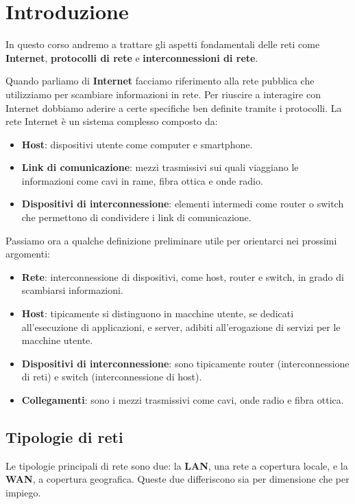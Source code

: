 \chapter{Introduzione}
In questo corso andremo a trattare gli aspetti fondamentali delle reti 
come \textbf{Internet}, \textbf{protocolli di rete} e
\textbf{interconnessioni di rete}.

Quando parliamo di \textbf{Internet} facciamo riferimento alla rete 
pubblica che utilizziamo per scambiare informazioni in rete. Per
riuscire a interagire con Internet dobbiamo aderire a certe specifiche 
ben definite tramite i protocolli. La rete Internet è un sistema 
complesso composto da:
\begin{itemize}
	\item \textbf{Host}: dispositivi utente come computer e smartphone.
	\item \textbf{Link di comunicazione}: mezzi trasmissivi sui quali
		viaggiano le informazioni come cavi in rame, fibra ottica e
		onde radio.
	\item \textbf{Dispositivi di interconnessione}: elementi intermedi
		come router o switch che permettono di condividere i link di
		comunicazione.
\end{itemize}
Passiamo ora a qualche definizione preliminare utile per orientarci
nei prossimi argomenti:
\begin{itemize}
	\item \textbf{Rete}: interconnessione di dispositivi, come host, 
		router e switch, in grado di scambiarsi informazioni.
	\item \textbf{Host}: tipicamente si distinguono in macchine 
		utente, se dedicati all'esecuzione di applicazioni, e server,
		adibiti all'erogazione di servizi per le macchine utente.
	\item \textbf{Dispositivi di interconnessione}: sono tipicamente 
		router (interconnessione di reti) e switch (interconnessione 
		di host).
	\item \textbf{Collegamenti}: sono i mezzi trasmissivi come cavi,
		onde radio e fibra ottica.
\end{itemize}

\section{Tipologie di reti}
Le tipologie principali di rete sono due: la \textbf{LAN}, una rete
a copertura locale, e la \textbf{WAN}, a copertura geografica. Queste
due differiscono sia per dimensione che per impiego.

